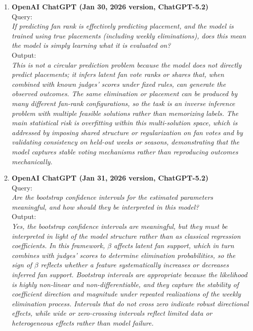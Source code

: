 \documentclass[12pt]{article}
\begin{document}
\begin{enumerate}
	\item \textbf{OpenAI ChatGPT (Jan 30, 2026 version, ChatGPT-5.2)}\\
	Query: \\
	\textit{If predicting fan rank is effectively predicting placement, and the model is trained using true placements (including weekly eliminations), does this mean the model is simply learning what it is evaluated on?}\\
	Output: \\
	\textit{This is not a circular prediction problem because the model does not directly predict placements; it infers latent fan vote ranks or shares that, when combined with known judges’ scores under fixed rules, can generate the observed outcomes. The same elimination or placement can be produced by many different fan-rank configurations, so the task is an inverse inference problem with multiple feasible solutions rather than memorizing labels. The main statistical risk is overfitting within this multi-solution space, which is addressed by imposing shared structure or regularization on fan votes and by validating consistency on held-out weeks or seasons, demonstrating that the model captures stable voting mechanisms rather than reproducing outcomes mechanically.}
	
	\item \textbf{OpenAI ChatGPT (Jan 31, 2026 version, ChatGPT-5.2)}\\
	Query: \\
	\textit{Are the bootstrap confidence intervals for the estimated parameters meaningful, and how should they be interpreted in this model?}\\
	Output: \\
	\textit{Yes, the bootstrap confidence intervals are meaningful, but they must be interpreted in light of the model structure rather than as classical regression coefficients. In this framework, \(\beta\) affects latent fan support, which in turn combines with judges’ scores to determine elimination probabilities, so the sign of \(\beta\) reflects whether a feature systematically increases or decreases inferred fan support. Bootstrap intervals are appropriate because the likelihood is highly non-linear and non-differentiable, and they capture the stability of coefficient direction and magnitude under repeated realizations of the weekly elimination process. Intervals that do not cross zero indicate robust directional effects, while wide or zero-crossing intervals reflect limited data or heterogeneous effects rather than model failure.}
	

\end{enumerate}
\end{document}
